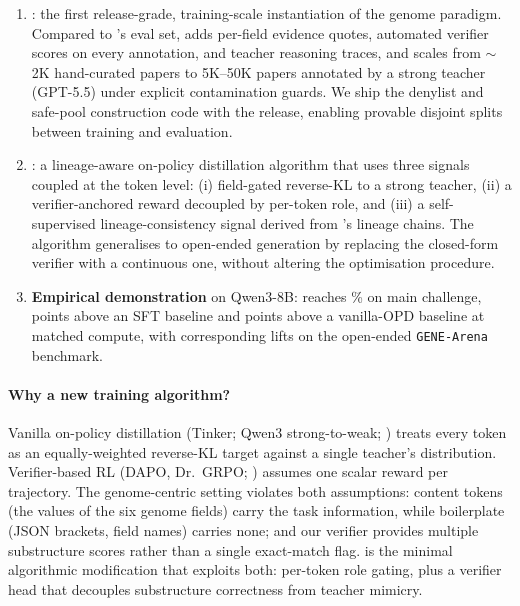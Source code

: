 \begin{enumerate}
  \item \textbf{\genetrace{}}: the first release-grade, training-scale
    instantiation of the genome paradigm. Compared to \ideaevolving's eval set,
    \genetrace{} adds per-field evidence quotes, automated verifier scores on
    every annotation, and teacher reasoning traces, and scales from $\sim$2K
    hand-curated papers to 5K--50K papers annotated by a strong teacher
    (GPT-5.5) under explicit contamination guards. We ship the denylist and
    safe-pool construction code with the release, enabling provable disjoint
    splits between training and \geneexam{} evaluation.
  \item \textbf{\evoopd{}}: a lineage-aware on-policy distillation algorithm
    that uses three signals coupled at the token level: (i) field-gated
    reverse-KL to a strong teacher, (ii) a verifier-anchored reward decoupled
    by per-token role, and (iii) a self-supervised lineage-consistency
    signal derived from \genetrace's lineage chains. The algorithm generalises
    to open-ended generation by replacing the closed-form verifier with a
    continuous one, without altering the optimisation procedure.
  \item \textbf{Empirical demonstration} on Qwen3-8B: \evoopd{} reaches
    \% on \geneexam{} main challenge,  points above an SFT
    baseline and  points above a vanilla-OPD baseline at matched
    compute, with corresponding lifts on the open-ended \texttt{GENE-Arena}
    benchmark.
\end{enumerate}

\paragraph{Why a new training algorithm?} Vanilla on-policy distillation
(Tinker; Qwen3 strong-to-weak; ) treats every token as an
equally-weighted reverse-KL target against a single teacher's distribution.
Verifier-based RL (DAPO, Dr.~GRPO; ) assumes one scalar reward
per trajectory. The genome-centric setting violates both assumptions:
content tokens (the values of the six genome fields) carry the task
information, while boilerplate (JSON brackets, field names) carries none;
and our verifier provides multiple substructure scores rather than a single
exact-match flag. \evoopd{} is the minimal algorithmic modification that
exploits both: per-token role gating, plus a verifier head that decouples
substructure correctness from teacher mimicry.


